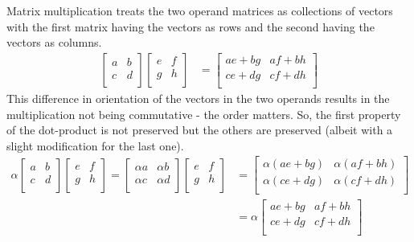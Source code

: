 \documentclass[../MathsNotesBase.tex]{subfiles}
\begin{document}
{		Matrix multiplication treats the two operand matrices as collections of vectors with the first matrix having the vectors as rows and the second having the vectors as columns.
		\begin{align*}
			\begin{bmatrix}
			a & b \\
			c & d \\
			\end{bmatrix}
			\begin{bmatrix}
			e & f \\
			g & h \\
			\end{bmatrix}
			&=
			\begin{bmatrix}
			ae + bg & af + bh \\
			ce + dg & cf + dh \\
			\end{bmatrix}
		\end{align*}
		This difference in orientation of the vectors in the two operands results in the multiplication not being commutative - the order matters. So, the first property of the dot-product is not preserved but the others are preserved (albeit with a slight modification for the last one).
		\begin{align*}						
			\alpha
			\begin{bmatrix}
			a & b \\
			c & d \\
			\end{bmatrix}
			\begin{bmatrix}
			e & f \\
			g & h \\
			\end{bmatrix}
			=
			\begin{bmatrix}
			\alpha a & \alpha b \\
			\alpha c & \alpha d \\
			\end{bmatrix}
			\begin{bmatrix}
			e & f \\
			g & h \\
			\end{bmatrix}
			&=
			\begin{bmatrix}
			\alpha(ae + bg) & \alpha(af + bh) \\
			\alpha(ce + dg) & \alpha(cf + dh) \\
			\end{bmatrix} 
			\\
			&=
			\alpha
			\begin{bmatrix}
			ae + bg & af + bh \\
			ce + dg & cf + dh \\
			\end{bmatrix}		
		\end{align*}
		
}
\end{document}
